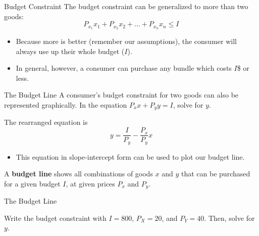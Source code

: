 \documentclass{beamer}
\begin{document}
\begin{frame}{Budget Constraint}
  The budget constraint can be generalized to more than two goods:
  $$
    P_{x_1} x_1 + P_{x_2} x_2 + ... + P_{x_n} x_n \leq I
  $$

  \bigskip
  \begin{itemize}
    \item Because more is better (remember our assumptions), the consumer will always use up their whole budget ($I$).

    \item In general, however, a consumer can purchase any bundle which costs $I$\$ or less.
  \end{itemize}
\end{frame}

\begin{frame}{The Budget Line}
  A consumer's budget constraint for two goods can also be represented graphically. In the equation $P_x x + P_y y = I$, solve for $y$.
  
  \bigskip
  The rearranged equation is 
  $$
    y = \frac{I}{P_y} - \frac{P_x}{P_y}x
  $$
  
  \begin{itemize}
    \item This equation in slope-intercept form can be used to plot our budget line.
  \end{itemize}

  \bigskip
  A \textbf{budget line} shows all combinations of goods $x$ and $y$ that can be purchased for a given budget $I$, at given prices $P_x$ and $P_y$.
\end{frame}

\begin{frame}{The Budget Line}

  \bigskip
  Write the budget constraint with $I = 800$, $P_X = 20$, and $P_Y = 40$. Then, solve for $y$.
\end{frame}
\end{document}

